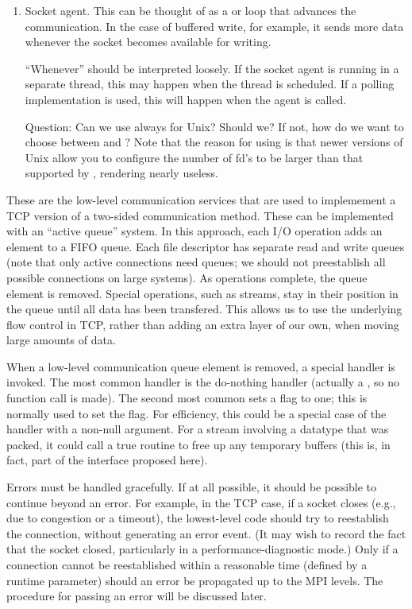 \begin{enumerate}
\item Socket agent.  This can be thought of as a 
    or  loop that advances the communication.  In the case
    of buffered write, for example, it sends more data whenever the
    socket becomes available for writing.

    ``Whenever'' should be interpreted loosely.  If the socket
    agent is running in a separate thread, this may happen when the
    thread is scheduled.  If a polling implementation is used, this
    will happen when the agent is called.

    Question: Can we use  always for Unix?  Should we?  If not, how
    do we want to choose between  and ?
    Note that the reason for using  is that newer versions of Unix
    allow you to configure the number of fd's to be larger than that supported
    by , rendering  nearly useless.

\end{enumerate}

These are the low-level communication services that are used to
implemement a TCP version of a two-sided communication method.
These can be implemented with an ``active queue'' system.  In this
approach, each I/O operation adds an element to a FIFO queue.  Each
file descriptor has separate read and write queues (note that only
active connections need queues; we should not preestablish all
possible connections on large systems).  As operations
complete, the queue element is removed.  Special operations, such as
streams, stay in their position in the queue until all data has been
transfered.  This allows us to use the underlying flow control in TCP,
rather than adding an extra layer of our own, when moving large
amounts of data.

When a low-level communication queue element is removed, a special handler is
invoked.  The 
most common handler is the do-nothing handler (actually a , so no
function call is made).  The second most common
sets a flag to one; this is normally used to set the
 flag.  For efficiency, this could be a
special case of the  handler with a non-null argument.
For a stream involving a datatype that was packed, it could call a true
routine to free up any temporary buffers (this is, in fact, part of the
interface proposed here).

Errors must be handled gracefully.  If at all possible, it should be possible
to continue beyond an error.  For example, in the TCP case, if a socket closes
(e.g., due to congestion or a timeout), the lowest-level code should try to
reestablish the connection, without generating an error event.  (It may wish
to record the fact that the socket closed, particularly in a
performance-diagnostic mode.)  Only if a connection cannot be reestablished
within a reasonable time (defined by a runtime parameter) should an error be
propagated up to the MPI levels.  The procedure for passing an error will be
discussed later.

